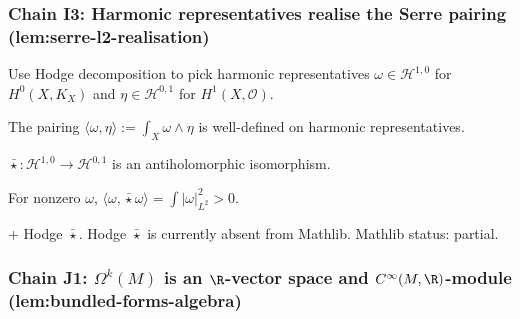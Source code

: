 \subsubsection*{Chain I3: Harmonic representatives realise the Serre pairing (lem:serre-l2-realisation)}

\begin{lemma}
\label{lem:sl2-r1}
Use Hodge decomposition to pick harmonic representatives $\omega \in \mathcal{H}^{1,0}$ for $H^{0}(X,K_{X})$ and $\eta \in \mathcal{H}^{0,1}$ for $H^{1}(X,\mathcal{O})$.
\leanok
\end{lemma}

\begin{lemma}
\label{lem:sl2-r2}
The pairing $\langle\omega,\eta\rangle := \int_{X}\omega\wedge\eta$ is well-defined on harmonic representatives.
\leanok
\end{lemma}

\begin{lemma}
\label{lem:sl2-r3}
$\bar\star : \mathcal{H}^{1,0} \to \mathcal{H}^{0,1}$ is an antiholomorphic isomorphism.
\leanok
\end{lemma}

\begin{lemma}
\label{lem:sl2-r4}
For nonzero $\omega$, $\langle\omega,\bar\star\omega\rangle = \int|\omega|^{2}_{L^{2}} > 0$.
\leanok
\end{lemma}

\begin{lemma}
\label{lem:sl2-r5}
 + Hodge $\bar\star$.  Hodge $\bar\star$ is currently absent from Mathlib.  Mathlib status: partial.
\leanok
\end{lemma}

\subsubsection*{Chain J1: $\Omega^{k}(M)$ is an $\R$-vector space and $C^{\infty}(M,\R)$-module (lem:bundled-forms-algebra)}


